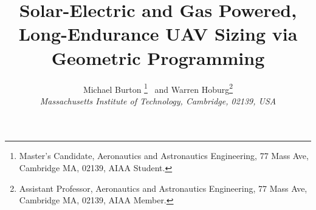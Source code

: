 \title{Solar-Electric and Gas Powered, Long-Endurance UAV Sizing via Geometric Programming}

 \author{
  Michael Burton \thanks{Master's Candidate, Aeronautics and Astronautics Engineering, 77 Mass Ave, Cambridge MA, 02139, AIAA Student.}
  \ and Warren Hoburg\thanks{Assistant Professor, Aeronautics and Astronautics Engineering, 77 Mass Ave, Cambridge MA, 02139, AIAA Member.}\\
  {\normalsize\itshape
   Massachusetts Institute of Technology, Cambridge, 02139, USA}\\
 }


 \newcommand{\eqnref}[1]{(\ref{#1})}
 \newcommand{\class}[1]{\texttt{#1}}
 \newcommand{\package}[1]{\texttt{#1}}
 \newcommand{\file}[1]{\texttt{#1}}
 \newcommand{\BibTeX}{\textsc{Bib}\TeX}
 \usepackage{hyperref}
 \hypersetup{citecolor = blue}
\RequirePackage[normalem]{ulem} %
\RequirePackage{color} %
\providecommand{\DIFaddtex}[1]{{\protect\color{blue}\uwave{#1}}} %
\providecommand{\DIFdeltex}[1]{{\protect\color{red}\sout{#1}}}                      %
\providecommand{\DIFaddbegin}{} %
\providecommand{\DIFaddend}{} %
\providecommand{\DIFdelbegin}{} %
\providecommand{\DIFdelend}{} %
\providecommand{\DIFaddFL}[1]{\DIFadd{#1}} %
\providecommand{\DIFdelFL}[1]{\DIFdel{#1}} %
\providecommand{\DIFaddbeginFL}{} %
\providecommand{\DIFaddendFL}{} %
\providecommand{\DIFdelbeginFL}{} %
\providecommand{\DIFdelendFL}{} %
\providecommand{\DIFadd}[1]{\texorpdfstring{\DIFaddtex{#1}}{#1}} %
\providecommand{\DIFdel}[1]{\texorpdfstring{\DIFdeltex{#1}}{}} %



